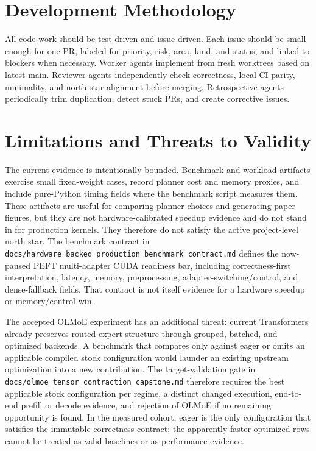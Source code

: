 \documentclass[11pt]{article}
\begin{document}
\section{Development Methodology}

All code work should be test-driven and issue-driven. Each issue should be
small enough for one PR, labeled for priority, risk, area, kind, and status, and
linked to blockers when necessary. Worker agents implement from fresh worktrees
based on latest main. Reviewer agents independently check correctness, local CI
parity, minimality, and north-star alignment before merging. Retrospective
agents periodically trim duplication, detect stuck PRs, and create corrective
issues.

\section{Limitations and Threats to Validity}

The current evidence is intentionally bounded. Benchmark and workload artifacts
exercise small fixed-weight cases, record planner cost and memory proxies, and
include pure-Python timing fields where the benchmark script measures them.
These artifacts are useful for comparing planner choices and generating paper
figures, but they are not hardware-calibrated speedup evidence and do not
stand in for production kernels. They therefore do not satisfy the active
project-level north star. The benchmark contract in
\texttt{docs/hardware\_backed\_production\_benchmark\_contract.md} defines the
now-paused PEFT multi-adapter CUDA readiness bar, including
correctness-first interpretation, latency, memory, preprocessing,
adapter-switching/control, and dense-fallback fields. That contract is not
itself evidence for a hardware speedup or memory/control win.

The accepted OLMoE experiment has an additional threat: current Transformers
already preserves routed-expert structure through grouped, batched, and
optimized backends. A benchmark that compares only against eager or omits an
applicable compiled stock configuration would launder an existing upstream
optimization into a new contribution. The target-validation gate in
\texttt{docs/olmoe\_tensor\_contraction\_capstone.md} therefore requires the best
applicable stock configuration per regime, a distinct changed execution,
end-to-end prefill or decode evidence, and rejection of OLMoE if no remaining
opportunity is found. In the measured cohort, eager is the only configuration
that satisfies the immutable correctness contract; the apparently faster
optimized rows cannot be treated as valid baselines or as performance evidence.
\end{document}
